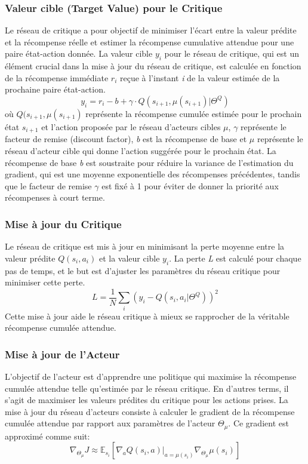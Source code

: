 \subsubsection{Valeur cible (Target Value) pour le Critique}
Le réseau de critique a pour objectif de minimiser l'écart entre la valeur prédite et la récompense réelle et estimer la récompense cumulative attendue pour une paire état-action donnée. La valeur cible $y_i$ pour le réseau de critique, qui est un élément crucial dans la mise à jour du réseau de critique, est calculée en fonction de la récompense immédiate $r_i$ reçue à l'instant \textit{i} de la valeur estimée de la prochaine paire état-action.
\begin{equation}
    y_i = r_i - b + \gamma \cdot Q(s_{i+1}, \mu (s_{i+1}) | \Theta^Q)
\end{equation}
où $Q(s_{i+1}, \mu (s_{i+1})$ représente la récompense cumulée estimée pour le prochain état $s_{i+1}$ et l'action proposée par le réseau d'acteurs cibles $\mu$, $\gamma$ représente le facteur de remise (discount factor), \textit{b} est la récompense de base et $\mu$ représente le réseau d'acteur cible qui donne l'action suggérée pour le prochain état. La récompense de base \textit{b} est soustraite pour réduire la variance de l'estimation du gradient, qui est une moyenne exponentielle des récompenses précédentes, tandis que le facteur de remise $\gamma$ est fixé à 1 pour éviter de donner la priorité aux récompenses à court terme.

\subsubsection{Mise à jour du Critique}
Le réseau de critique est mis à jour en minimisant la perte moyenne entre la valeur prédite $Q(s_i,a_i)$ et la valeur cible $y_i$. La perte \textit{L} est calculé pour chaque pas de temps, et le but est d'ajuster les paramètres du réseau critique pour minimiser cette perte. 
\begin{equation}
    L = \frac{1}{N}\sum_i(y_i - Q(s_i, a_i | \Theta^Q))^2
\end{equation}
Cette mise à jour aide le réseau critique à mieux se rapprocher de la véritable récompense cumulée attendue.

\subsubsection{Mise à jour de l'Acteur}
L'objectif de l'acteur est d'apprendre une politique qui maximise la récompense cumulée attendue telle qu'estimée par le réseau critique. En d'autres terms, il s'agit de maximiser les valeurs prédites du critique pour les actions prises. La mise à jour du réseau d'acteurs consiste à calculer le gradient de la récompense cumulée attendue par rapport aux paramètres de l'acteur $\Theta_\mu$. Ce gradient est approximé comme suit:
\begin{equation}
    \nabla_{\Theta_\mu}J \approx \mathbb{E}_{s_i}[\nabla_a Q(s_i, a) |_{a=\mu(s_i)} \nabla_{\Theta_\mu}\mu(s_i)]
\end{equation}

